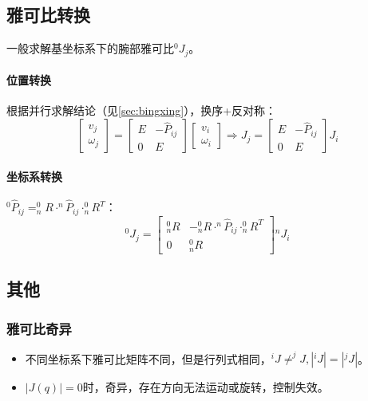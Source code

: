 \documentclass[
12pt, %
a4paper, 
oneside, %
headinclude,footinclude, %
]{scrartcl}
\begin{document}
\subsection{雅可比转换}
一般求解基坐标系下的腕部雅可比$ ^0 J_j $。
\paragraph{位置转换}
根据并行求解结论（见\ref{sec:bingxing}），换序+反对称：
$$ 
\begin{bmatrix} v_j \\ \omega_j \end{bmatrix} 
=
\begin{bmatrix} E & -\hat{P}_{ij} \\ 0 & E \end{bmatrix}
\begin{bmatrix} v_i \\ \omega_i \end{bmatrix} 
\Rightarrow 
J_j = \begin{bmatrix} E & -\hat{P}_{ij} \\ 0 & E \end{bmatrix} J_i
$$ 
\paragraph{坐标系转换}
$ ^0\hat{P}_{ij} = ^0_n R \cdot ^n\hat{P}_{ij} \cdot ^0_n R^T $：
$$ ^0 J_j = \begin{bmatrix} ^0_n R & -^0_n R \cdot ^n\hat{P}_{ij} \cdot ^0_n R^T \\ 0 & ^0_n R \end{bmatrix} {}^n J_i $$
\subsection{其他}
\subsubsection{雅可比奇异}
\begin{itemize}
\item 不同坐标系下雅可比矩阵不同，但是行列式相同，$ ^i J \neq ^j J, |^i J| = |^j J| $。
\item $ |J(q)| = 0 $时，奇异，存在方向无法运动或旋转，控制失效。
\end{itemize} 
\end{document}
